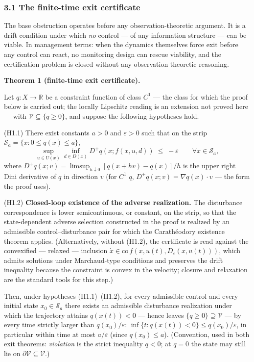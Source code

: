 \documentclass[11pt]{article}
\begin{document}
\subsubsection{3.1 The finite-time exit
certificate}\label{the-finite-time-exit-certificate}

The base obstruction operates before any observation-theoretic argument.
It is a drift condition under which \emph{no} control --- of any
information structure --- can be viable. In management terms: when the
dynamics themselves force exit before any control can react, no
monitoring design can rescue viability, and the certification problem is
closed without any observation-theoretic reasoning.

\textbf{Theorem 1 (finite-time exit certificate).}

Let \(q : X \to \mathbb{R}\) be a constraint function of class \(C^1\)
--- the class for which the proof below is carried out; the locally Lipschitz reading is an extension not proved here --- with
\(\mathcal{V} \subseteq \{ q \ge 0 \}\), and suppose the following
hypotheses hold.

(H1.1) There exist constants \(a > 0\) and \(\varepsilon > 0\) such that
on the strip \(\mathcal{S}_a = \{ x : 0 \le q(x) \le a \}\),
\[\sup_{u \in U(x)} \inf_{d \in D(x)} D^+ q(x; f(x,u,d)) \;\le\; -\varepsilon \qquad \forall x \in \mathcal{S}_a, \tag{1}\]
where \(D^+ q(x; v) = \limsup_{h \downarrow 0} [q(x + hv) - q(x)]/h\) is
the upper right Dini derivative of \(q\) in direction \(v\) (for \(C^1\)
\(q\), \(D^+ q(x; v) = \nabla q(x) \cdot v\) --- the form the proof
uses).

(H1.2) \textbf{Closed-loop existence of the adverse realization.} The
disturbance correspondence is lower semicontinuous, or constant, on the
strip, so that the state-dependent adverse selection constructed in the
proof is realized by an admissible control--disturbance pair for which
the Carath\'eodory existence theorem applies. (Alternatively, without (H1.2), the certificate is read against the convexified ---
relaxed --- inclusion
\(\dot x \in \mathrm{co}\, f(x, u(t), D_{\varepsilon}(x, u(t)))\), which
admits solutions under Marchaud-type conditions and preserves the drift
inequality because the constraint is convex in the velocity; closure and
relaxation are the standard tools for this step.)

Then, under hypotheses (H1.1)--(H1.2), for every
admissible control and every initial state \(x_0 \in \mathcal{S}_a\)
there exists an admissible disturbance realization under which the
trajectory attains \(q(x(t)) < 0\) --- hence leaves
\(\{ q \ge 0 \} \supseteq \mathcal{V}\) --- by every time strictly
larger than \(q(x_0)/\varepsilon\):
\(\inf\{ t : q(x(t)) < 0 \} \le q(x_0)/\varepsilon\), in particular
within time at most \(a/\varepsilon\) (since \(q(x_0) \le a\)).
(Convention, used in both exit theorems: \emph{violation} is the strict
inequality \(q < 0\); at \(q = 0\) the state may still lie on
\(\partial \mathcal{V} \subseteq \mathcal{V}\).)
\end{document}
